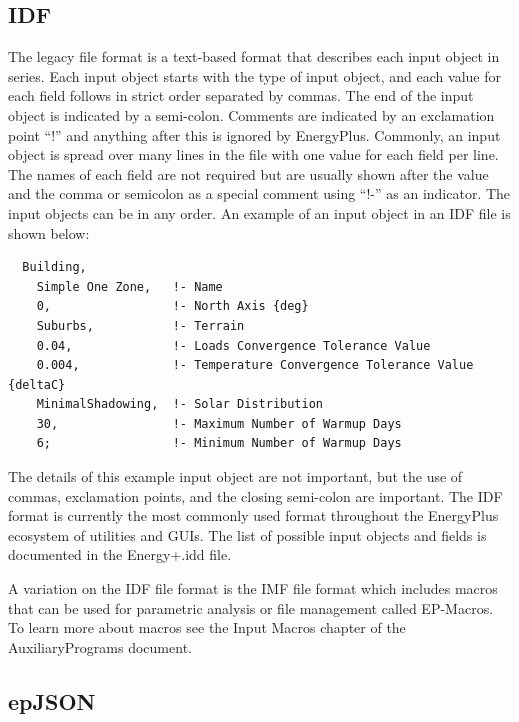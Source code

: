 \subsection*{IDF}

The legacy file format is a text-based format that describes each
input object in series. Each input object starts with the type of
input object, and each value for each field follows in strict order
separated by commas. The end of the input object is indicated by a
semi-colon. Comments are indicated by an exclamation point ``!''
and anything after this is ignored by EnergyPlus. Commonly, an input
object is spread over many lines in the file with one value for each
field per line. The names of each field are not required but are usually
shown after the value and the comma or semicolon as a special comment
using ``!-'' as an indicator. The input objects can be in any order.
An example of an input object in an IDF file is shown below:
\begin{verbatim}
  Building,
    Simple One Zone,   !- Name
    0,                 !- North Axis {deg}
    Suburbs,           !- Terrain
    0.04,              !- Loads Convergence Tolerance Value
    0.004,             !- Temperature Convergence Tolerance Value {deltaC}
    MinimalShadowing,  !- Solar Distribution
    30,                !- Maximum Number of Warmup Days
    6;                 !- Minimum Number of Warmup Days
\end{verbatim}
The details of this example input object are not important, but the
use of commas, exclamation points, and the closing semi-colon are
important. The IDF format is currently the most commonly used format
throughout the EnergyPlus ecosystem of utilities and GUIs. The list
of possible input objects and fields is documented in the Energy+.idd
file.

A variation on the IDF file format is the IMF file format which includes
macros that can be used for parametric analysis or file management
called EP-Macros. To learn more about macros see the Input Macros
chapter of the AuxiliaryPrograms document.

\subsection*{epJSON}

